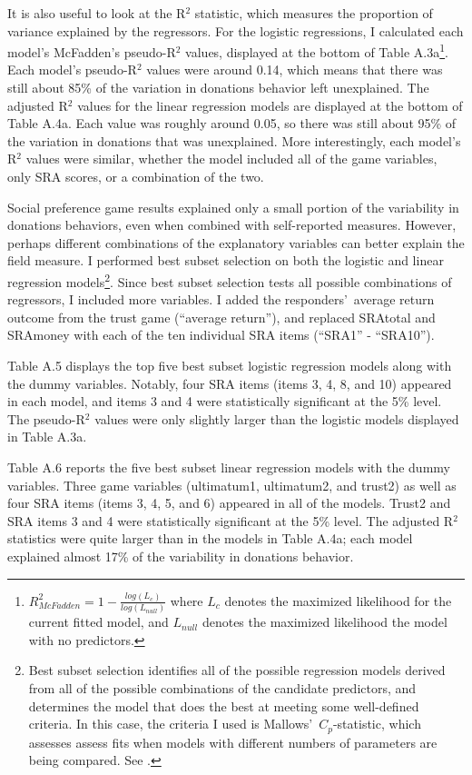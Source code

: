 \documentclass[12pt]{article}
\begin{document}
It is also useful to look at the R$^{2}$ statistic, which measures the proportion of variance explained by the regressors. For the logistic regressions, I calculated each model\rq s McFadden\rq s pseudo-R$^{2}$ values, displayed at the bottom of Table A.3a\footnote{
\(R^{2}_{McFadden} = 1 - \frac{log(L_{c})}{log(L_{null})}\)
where \(L_{c}\) denotes the maximized likelihood for the current fitted model, and \(L_{null}\) denotes the maximized likelihood the model with no predictors.
}. Each model\rq s pseudo-R$^{2}$ values were around 0.14, which means that there was still about 85\% of the variation in donations behavior left unexplained. The adjusted R$^{2}$ values for the linear regression models are displayed at the bottom of Table A.4a. Each value was roughly around 0.05, so there was still about 95\% of the variation in donations that was unexplained. More interestingly, each model\rq s R$^{2}$ values were similar, whether the model included all of the game variables, only SRA scores, or a combination of the two.

Social preference game results explained only a small portion of the variability in donations behaviors, even when combined with self-reported measures. However, perhaps different combinations of the explanatory variables can better explain the field measure. I performed best subset selection on both the logistic and linear regression models\footnote{Best subset selection identifies all of the possible regression models derived from all of the possible combinations of the candidate predictors, and determines the model that does the best at meeting some well-defined criteria. In this case, the criteria I used is Mallows\rq \ \(C_{p}\)-statistic, which assesses assess fits when models with different numbers of parameters are being compared.  See \cite{mallows_1973}.}. Since best subset selection tests all possible combinations of regressors, I included more variables. I added the responders\rq \ average return outcome from the trust game (``average return''), and replaced SRAtotal and SRAmoney with each of the ten individual SRA items (``SRA1'' - ``SRA10''). 

Table A.5 displays the top five best subset logistic regression models along with the dummy variables. Notably, four SRA items (items 3, 4, 8, and 10) appeared in each model, and items 3 and 4 were statistically significant at the 5\% level. The pseudo-R$^{2}$ values were only slightly larger than the logistic models displayed in Table A.3a.

Table A.6 reports the five best subset linear regression models with the dummy variables. Three game variables (ultimatum1, ultimatum2, and trust2) as well as four SRA items (items 3, 4, 5, and 6) appeared in all of the models. Trust2 and SRA items 3 and 4 were statistically significant at the 5\% level. The adjusted R$^{2}$ statistics were quite larger than in the models in Table A.4a; each model explained almost 17\% of the variability in donations behavior. 
\end{document}
